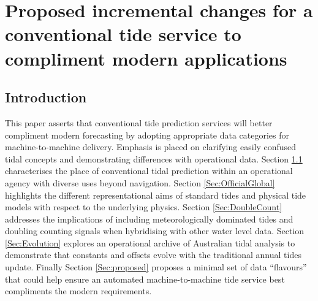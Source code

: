 \chapter{Proposed incremental changes for a conventional tide service to compliment modern applications}

\newcommand{\Ba}{63540}
\newcommand{\Ca}{46290}
\newcommand{\Da}{62430}
\newcommand{\Ea}{62290}
\newcommand{\Fa}{61561}
\newcommand{\Ga}{57720}

\newcommand{\Bb}{529020}
\newcommand{\Cb}{200970}
\newcommand{\Db}{005096}
\newcommand{\Eb}{008314}
\newcommand{\Fb}{523757}
\newcommand{\Gb}{200854}

\newcommand{\Bname}{Mornington Island}
\newcommand{\Cname}{Christmas Island}
\newcommand{\Dname}{Point Murat}
\newcommand{\Ename}{Geraldton}
\newcommand{\Fname}{Cape Jervis}
\newcommand{\Gname}{Lord Howe Island}

\newcommand{\figwidthFull}{0.75\textwidth}
\newcommand{\figwidthHalf}{0.35\textwidth}
\newcommand{\figwidthThird}{0.22\textwidth}
\section{Introduction}
\label{Sec:intro}
This paper asserts that conventional tide prediction services will better compliment modern forecasting by adopting appropriate data categories for machine-to-machine delivery.   Emphasis is placed on clarifying easily confused tidal concepts and demonstrating differences with operational data.   
Section \ref{Sec:intro} characterises the place of conventional tidal prediction within an operational agency with diverse uses beyond navigation. Section \ref{Sec:OfficialGlobal} highlights the different representational aims of standard tides and physical tide models with respect to the underlying physics.   Section \ref{Sec:DoubleCount} addresses the implications of including meteorologically dominated tides and doubling counting signals when hybridising with other water level data. Section \ref{Sec:Evolution} explores an operational archive of Australian tidal analysis to demonstrate that constants and offsets evolve with the traditional annual tides update.   Finally Section \ref{Sec:proposed} proposes a minimal set of data ``flavours'' that could help ensure an automated machine-to-machine tide service best compliments the modern requirements. 


